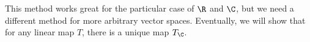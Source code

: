 \documentclass[10pt]{mypackage}
\begin{document}
This method works great for the particular case of $\R$ and $\C$, but we need a different method for more arbitrary vector spaces. Eventually, we will show that for any linear map $T$, there is a unique map $T_{\C}$.
\begin{center}
\end{center}
\end{document}
